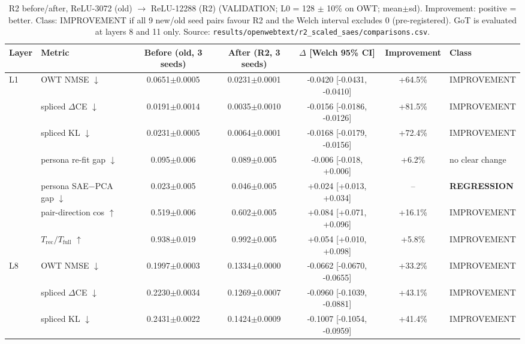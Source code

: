 \begin{table}[t]
\centering
\small
\caption{R2 before/after, ReLU-3072 (old) $\rightarrow$ ReLU-12288 (R2) (VALIDATION; L0 = 128 $\pm$ 10\% on OWT; mean$\pm$sd). Improvement: positive = better. Class: IMPROVEMENT if all 9 new/old seed pairs favour R2 and the Welch interval excludes 0 (pre-registered). GoT is evaluated at layers 8 and 11 only. Source: \texttt{results/\allowbreak{}openwebtext/\allowbreak{}r2\_scaled\_saes/\allowbreak{}comparisons.csv}.}
\label{tab:r2_c2}
\begin{adjustbox}{max width=\linewidth}
\begin{tabular}{llccccl}
\toprule
Layer & Metric & Before (old, 3 seeds) & After (R2, 3 seeds) & $\Delta$ [Welch 95\% CI] & Improvement & Class \\
\midrule
L1 & OWT NMSE $\downarrow$ & 0.0651$\pm$0.0005 & 0.0231$\pm$0.0001 & -0.0420 [-0.0431, -0.0410] & +64.5\% & IMPROVEMENT \\
 & spliced $\Delta$CE $\downarrow$ & 0.0191$\pm$0.0014 & 0.0035$\pm$0.0010 & -0.0156 [-0.0186, -0.0126] & +81.5\% & IMPROVEMENT \\
 & spliced KL $\downarrow$ & 0.0231$\pm$0.0005 & 0.0064$\pm$0.0001 & -0.0168 [-0.0179, -0.0156] & +72.4\% & IMPROVEMENT \\
 & persona re-fit gap $\downarrow$ & 0.095$\pm$0.006 & 0.089$\pm$0.005 & -0.006 [-0.018, +0.006] & +6.2\% & no clear change \\
 & persona SAE$-$PCA gap $\downarrow$ & 0.023$\pm$0.005 & 0.046$\pm$0.005 & +0.024 [+0.013, +0.034] & -- & \textbf{REGRESSION} \\
 & pair-direction cos $\uparrow$ & 0.519$\pm$0.006 & 0.602$\pm$0.005 & +0.084 [+0.071, +0.096] & +16.1\% & IMPROVEMENT \\
 & $T_{\text{rec}}/T_{\text{full}}$ $\uparrow$ & 0.938$\pm$0.019 & 0.992$\pm$0.005 & +0.054 [+0.010, +0.098] & +5.8\% & IMPROVEMENT \\
\midrule
L8 & OWT NMSE $\downarrow$ & 0.1997$\pm$0.0003 & 0.1334$\pm$0.0000 & -0.0662 [-0.0670, -0.0655] & +33.2\% & IMPROVEMENT \\
 & spliced $\Delta$CE $\downarrow$ & 0.2230$\pm$0.0034 & 0.1269$\pm$0.0007 & -0.0960 [-0.1039, -0.0881] & +43.1\% & IMPROVEMENT \\
 & spliced KL $\downarrow$ & 0.2431$\pm$0.0022 & 0.1424$\pm$0.0009 & -0.1007 [-0.1054, -0.0959] & +41.4\% & IMPROVEMENT \\

\end{tabular}
\end{adjustbox}
\end{table}
